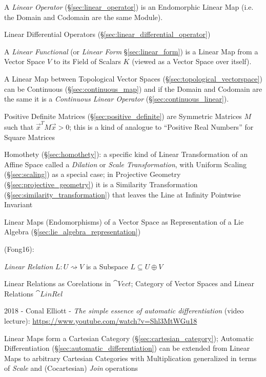 A \emph{Linear Operator} (\S\ref{sec:linear_operator}) is an Endomorphic Linear
Map (i.e. the Domain and Codomain are the same Module).

\fist Linear Differential Operators (\S\ref{sec:linear_differential_operator})

A \emph{Linear Functional} (or \emph{Linear Form} \S\ref{sec:linear_form}) is a
Linear Map from a Vector Space $V$ to its Field of Scalars $K$ (viewed as a
Vector Space over itself).

A Linear Map between Topological Vector Spaces
(\S\ref{sec:topological_vectorspace}) can be Continuous
(\S\ref{sec:continuous_map}) and if the Domain and Codomain are the same it is a
\emph{Continuous Linear Operator} (\S\ref{sec:continuous_linear}).

Positive Definite Matrices (\S\ref{sec:positive_definite}) are Symmetric
Matrices $M$ such that $\vec{x}^T M \vec{x} > 0$; this is a kind of analogue to
``Positive Real Numbers'' for Square Matrices

Homothety (\S\ref{sec:homothety}): a specific kind of Linear Transformation of
an Affine Space called a \emph{Dilation} or \emph{Scale Transformation}, with
Uniform Scaling (\S\ref{sec:scaling}) as a special case; in Projective Geometry
(\S\ref{sec:projective_geometry}) it is a Similarity Transformation
(\S\ref{sec:similarity_transformation}) that leaves the Line at Infinity
Pointwise Invariant

Linear Maps (Endomorphisms) of a Vector Space as Representation of a Lie Algebra
(\S\ref{sec:lie_algebra_representation})

(Fong16):


\emph{Linear Relation} $L : U \rightsquigarrow V$ is a Subspace $L
\subseteq U \oplus V$

Linear Relations as Corelations in $\cat{Vect}$; Category of Vector
Spaces and Linear Relations $\cat{LinRel}$

2018 - Conal Elliott - \emph{The simple essence of automatic differentiation}
(video lecture): \url{https://www.youtube.com/watch?v=Shl3MtWGu18}

Linear Maps form a Cartesian Category (\S\ref{sec:cartesian_category});
Automatic Differentiation (\S\ref{sec:automatic_differentiation}) can be
extended from Linear Maps to arbitrary Cartesian Categories with Multiplication
generalized in terms of \emph{Scale} and (Cocartesian) \emph{Join} operations



